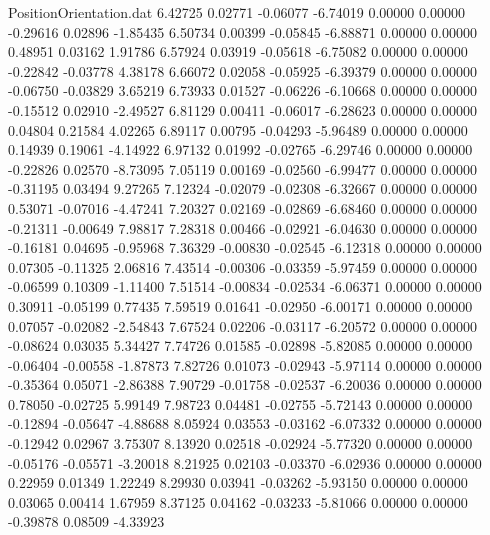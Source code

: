\begin{filecontents}{PositionOrientation.dat}
   6.42725    0.02771   -0.06077    -6.74019    0.00000    0.00000   -0.29616    0.02896   -1.85435
   6.50734    0.00399   -0.05845    -6.88871    0.00000    0.00000    0.48951    0.03162    1.91786
   6.57924    0.03919   -0.05618    -6.75082    0.00000    0.00000   -0.22842   -0.03778    4.38178
   6.66072    0.02058   -0.05925    -6.39379    0.00000    0.00000   -0.06750   -0.03829    3.65219
   6.73933    0.01527   -0.06226    -6.10668    0.00000    0.00000   -0.15512    0.02910   -2.49527
   6.81129    0.00411   -0.06017    -6.28623    0.00000    0.00000    0.04804    0.21584    4.02265
   6.89117    0.00795   -0.04293    -5.96489    0.00000    0.00000    0.14939    0.19061   -4.14922
   6.97132    0.01992   -0.02765    -6.29746    0.00000    0.00000   -0.22826    0.02570   -8.73095
   7.05119    0.00169   -0.02560    -6.99477    0.00000    0.00000   -0.31195    0.03494    9.27265
   7.12324   -0.02079   -0.02308    -6.32667    0.00000    0.00000    0.53071   -0.07016   -4.47241
   7.20327    0.02169   -0.02869    -6.68460    0.00000    0.00000   -0.21311   -0.00649    7.98817
   7.28318    0.00466   -0.02921    -6.04630    0.00000    0.00000   -0.16181    0.04695   -0.95968
   7.36329   -0.00830   -0.02545    -6.12318    0.00000    0.00000    0.07305   -0.11325    2.06816
   7.43514   -0.00306   -0.03359    -5.97459    0.00000    0.00000   -0.06599    0.10309   -1.11400
   7.51514   -0.00834   -0.02534    -6.06371    0.00000    0.00000    0.30911   -0.05199    0.77435
   7.59519    0.01641   -0.02950    -6.00171    0.00000    0.00000    0.07057   -0.02082   -2.54843
   7.67524    0.02206   -0.03117    -6.20572    0.00000    0.00000   -0.08624    0.03035    5.34427
   7.74726    0.01585   -0.02898    -5.82085    0.00000    0.00000   -0.06404   -0.00558   -1.87873
   7.82726    0.01073   -0.02943    -5.97114    0.00000    0.00000   -0.35364    0.05071   -2.86388
   7.90729   -0.01758   -0.02537    -6.20036    0.00000    0.00000    0.78050   -0.02725    5.99149
   7.98723    0.04481   -0.02755    -5.72143    0.00000    0.00000   -0.12894   -0.05647   -4.88688
   8.05924    0.03553   -0.03162    -6.07332    0.00000    0.00000   -0.12942    0.02967    3.75307
   8.13920    0.02518   -0.02924    -5.77320    0.00000    0.00000   -0.05176   -0.05571   -3.20018
   8.21925    0.02103   -0.03370    -6.02936    0.00000    0.00000    0.22959    0.01349    1.22249
   8.29930    0.03941   -0.03262    -5.93150    0.00000    0.00000    0.03065    0.00414    1.67959
   8.37125    0.04162   -0.03233    -5.81066    0.00000    0.00000   -0.39878    0.08509   -4.33923

\end{filecontents}
